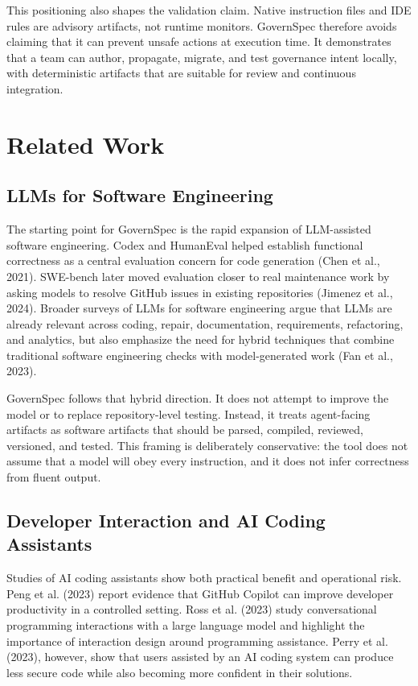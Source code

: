 \documentclass[11pt]{article}
\begin{document}
This positioning also shapes the validation claim. Native instruction files and IDE
rules are advisory artifacts, not runtime monitors. GovernSpec therefore avoids
claiming that it can prevent unsafe actions at execution time. It demonstrates that
a team can author, propagate, migrate, and test governance intent locally, with
deterministic artifacts that are suitable for review and continuous integration.

\section{Related Work}

\subsection{LLMs for Software Engineering}

The starting point for GovernSpec is the rapid expansion of LLM-assisted software
engineering. Codex and HumanEval helped establish functional correctness as a
central evaluation concern for code generation (Chen et al., 2021). SWE-bench later
moved evaluation closer to real maintenance work by asking models to resolve GitHub
issues in existing repositories (Jimenez et al., 2024). Broader surveys of LLMs for
software engineering argue that LLMs are already relevant across coding, repair,
documentation, requirements, refactoring, and analytics, but also emphasize the need
for hybrid techniques that combine traditional software engineering checks with
model-generated work (Fan et al., 2023).

GovernSpec follows that hybrid direction. It does not attempt to improve the model
or to replace repository-level testing. Instead, it treats agent-facing artifacts as
software artifacts that should be parsed, compiled, reviewed, versioned, and tested.
This framing is deliberately conservative: the tool does not assume that a model
will obey every instruction, and it does not infer correctness from fluent output.

\subsection{Developer Interaction and AI Coding Assistants}

Studies of AI coding assistants show both practical benefit and operational risk.
Peng et al. (2023) report evidence that GitHub Copilot can improve developer
productivity in a controlled setting. Ross et al. (2023) study conversational
programming interactions with a large language model and highlight the importance of
interaction design around programming assistance. Perry et al. (2023), however,
show that users assisted by an AI coding system can produce less secure code while
also becoming more confident in their solutions.
\end{document}
